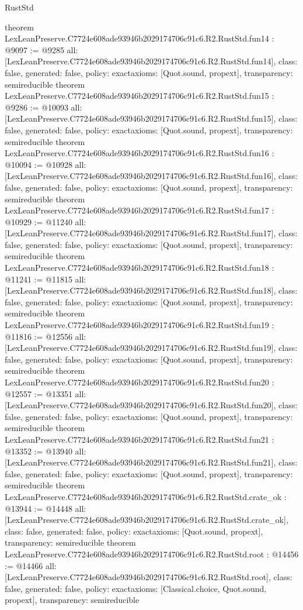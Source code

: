 \begin{lexlean}{RustStd}
\begin{coremodule}
{}
theorem LexLeanPreserve.C7724e608ade93946b2029174706c91c6.R2.RustStd.fun14 : @9097 := @9285 {
  all: [LexLeanPreserve.C7724e608ade93946b2029174706c91c6.R2.RustStd.fun14],
  class: false,
  generated: false,
  policy: exact{axioms: [Quot.sound, propext]},
  transparency: semireducible
}
theorem LexLeanPreserve.C7724e608ade93946b2029174706c91c6.R2.RustStd.fun15 : @9286 := @10093 {
  all: [LexLeanPreserve.C7724e608ade93946b2029174706c91c6.R2.RustStd.fun15],
  class: false,
  generated: false,
  policy: exact{axioms: [Quot.sound, propext]},
  transparency: semireducible
}
theorem LexLeanPreserve.C7724e608ade93946b2029174706c91c6.R2.RustStd.fun16 : @10094 := @10928 {
  all: [LexLeanPreserve.C7724e608ade93946b2029174706c91c6.R2.RustStd.fun16],
  class: false,
  generated: false,
  policy: exact{axioms: [Quot.sound, propext]},
  transparency: semireducible
}
theorem LexLeanPreserve.C7724e608ade93946b2029174706c91c6.R2.RustStd.fun17 : @10929 := @11240 {
  all: [LexLeanPreserve.C7724e608ade93946b2029174706c91c6.R2.RustStd.fun17],
  class: false,
  generated: false,
  policy: exact{axioms: [Quot.sound, propext]},
  transparency: semireducible
}
theorem LexLeanPreserve.C7724e608ade93946b2029174706c91c6.R2.RustStd.fun18 : @11241 := @11815 {
  all: [LexLeanPreserve.C7724e608ade93946b2029174706c91c6.R2.RustStd.fun18],
  class: false,
  generated: false,
  policy: exact{axioms: [Quot.sound, propext]},
  transparency: semireducible
}
theorem LexLeanPreserve.C7724e608ade93946b2029174706c91c6.R2.RustStd.fun19 : @11816 := @12556 {
  all: [LexLeanPreserve.C7724e608ade93946b2029174706c91c6.R2.RustStd.fun19],
  class: false,
  generated: false,
  policy: exact{axioms: [Quot.sound, propext]},
  transparency: semireducible
}
theorem LexLeanPreserve.C7724e608ade93946b2029174706c91c6.R2.RustStd.fun20 : @12557 := @13351 {
  all: [LexLeanPreserve.C7724e608ade93946b2029174706c91c6.R2.RustStd.fun20],
  class: false,
  generated: false,
  policy: exact{axioms: [Quot.sound, propext]},
  transparency: semireducible
}
theorem LexLeanPreserve.C7724e608ade93946b2029174706c91c6.R2.RustStd.fun21 : @13352 := @13940 {
  all: [LexLeanPreserve.C7724e608ade93946b2029174706c91c6.R2.RustStd.fun21],
  class: false,
  generated: false,
  policy: exact{axioms: [Quot.sound, propext]},
  transparency: semireducible
}
theorem LexLeanPreserve.C7724e608ade93946b2029174706c91c6.R2.RustStd.crate_ok : @13944 := @14448 {
  all: [LexLeanPreserve.C7724e608ade93946b2029174706c91c6.R2.RustStd.crate_ok],
  class: false,
  generated: false,
  policy: exact{axioms: [Quot.sound, propext]},
  transparency: semireducible
}
theorem LexLeanPreserve.C7724e608ade93946b2029174706c91c6.R2.RustStd.root : @14456 := @14466 {
  all: [LexLeanPreserve.C7724e608ade93946b2029174706c91c6.R2.RustStd.root],
  class: false,
  generated: false,
  policy: exact{axioms: [Classical.choice, Quot.sound, propext]},
  transparency: semireducible
}


\end{coremodule}
\end{lexlean}
